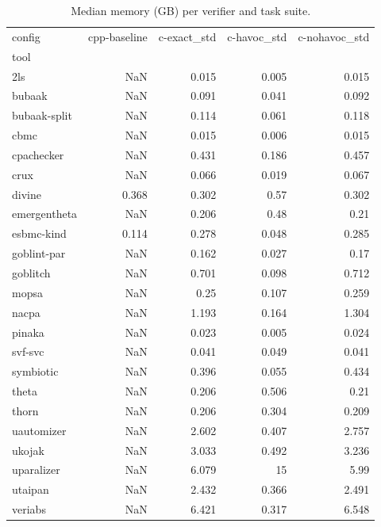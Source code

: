 \begin{table}[t]
  \centering
  \caption{Median memory (GB) per verifier and task suite.}
  \label{tab:mem-median-by-tool}
\begin{tabular}{lrrrr}
\toprule
config & cpp-baseline & c-exact\_std & c-havoc\_std & c-nohavoc\_std \\
tool &  &  &  &  \\
\midrule
2ls & NaN & 0.015 & 0.005 & 0.015 \\
bubaak & NaN & 0.091 & 0.041 & 0.092 \\
bubaak-split & NaN & 0.114 & 0.061 & 0.118 \\
cbmc & NaN & 0.015 & 0.006 & 0.015 \\
cpachecker & NaN & 0.431 & 0.186 & 0.457 \\
crux & NaN & 0.066 & 0.019 & 0.067 \\
divine & 0.368 & 0.302 & 0.57 & 0.302 \\
emergentheta & NaN & 0.206 & 0.48 & 0.21 \\
esbmc-kind & 0.114 & 0.278 & 0.048 & 0.285 \\
goblint-par & NaN & 0.162 & 0.027 & 0.17 \\
goblitch & NaN & 0.701 & 0.098 & 0.712 \\
mopsa & NaN & 0.25 & 0.107 & 0.259 \\
nacpa & NaN & 1.193 & 0.164 & 1.304 \\
pinaka & NaN & 0.023 & 0.005 & 0.024 \\
svf-svc & NaN & 0.041 & 0.049 & 0.041 \\
symbiotic & NaN & 0.396 & 0.055 & 0.434 \\
theta & NaN & 0.206 & 0.506 & 0.21 \\
thorn & NaN & 0.206 & 0.304 & 0.209 \\
uautomizer & NaN & 2.602 & 0.407 & 2.757 \\
ukojak & NaN & 3.033 & 0.492 & 3.236 \\
uparalizer & NaN & 6.079 & 15 & 5.99 \\
utaipan & NaN & 2.432 & 0.366 & 2.491 \\
veriabs & NaN & 6.421 & 0.317 & 6.548 \\
\bottomrule
\end{tabular}
\end{table}
